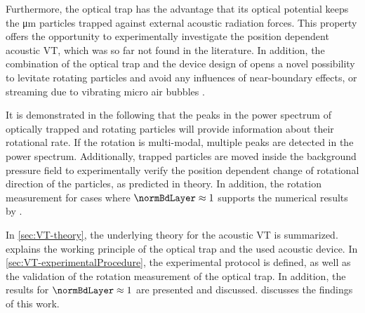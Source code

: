 Furthermore, the optical trap has the advantage that its optical potential keeps 
the \si{\micro\meter} particles trapped against external acoustic radiation 
forces. This property offers the opportunity to experimentally investigate the 
position dependent acoustic VT, which was so far not found in the literature.  
In addition, the combination of the optical trap and the device design of 
\citeauthor{Schwarz2015} \cite{Schwarz2015} opens a novel possibility to levitate 
rotating particles and avoid any influences of near-boundary effects, or 
streaming due to vibrating micro air bubbles \cite{Lamprecht2013}.

It is demonstrated in the following that the peaks in the power spectrum of 
optically trapped and rotating particles will provide information about their 
rotational rate. If the rotation is multi-modal, multiple peaks are detected in 
the power spectrum. Additionally, trapped particles are moved inside the 
background pressure field to experimentally verify the position dependent change 
of rotational direction of the particles, as predicted in theory. In addition, 
the rotation measurement for cases where $\normBdLayer \approx 1$ supports the 
numerical results by \citeauthor{Hahn2016}.

In \cref{sec:VT-theory}, the underlying theory for the acoustic VT is summarized.  
 explains the working principle of the optical trap 
and the used acoustic device. In \cref{sec:VT-experimentalProcedure}, the 
experimental protocol is defined, as well as the validation of the rotation 
measurement of the optical trap. In addition, the results for $\normBdLayer 
\approx 1$ are presented and discussed.  discusses the 
findings of this work.
